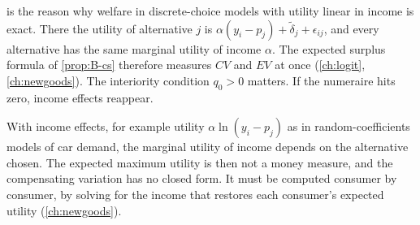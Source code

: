  is the reason why welfare in discrete-choice models with utility linear in income
is exact. There the utility of alternative $j$ is $\alpha(y_i - p_j) + \tilde\delta_j + \epsilon_{ij}$, and every
alternative has the same marginal utility of income $\alpha$. The expected surplus formula of
\cref{prop:B-cs} therefore measures $CV$ and $EV$ at once (\cref{ch:logit}, \cref{ch:newgoods}). The interiority
condition $q_0 > 0$ matters. If the numeraire hits zero, income effects reappear.

\begin{remark}\label{rem:B-income-effects}
With income effects, for example utility $\alpha\ln(y_i - p_j)$ as in random-coefficients models of car demand,
the marginal utility of income depends on the alternative chosen. The expected maximum utility is then not
a money measure, and the compensating variation has no closed form. It must be computed consumer by
consumer, by solving for the income that restores each consumer's expected utility (\cref{ch:newgoods}).
\end{remark}

